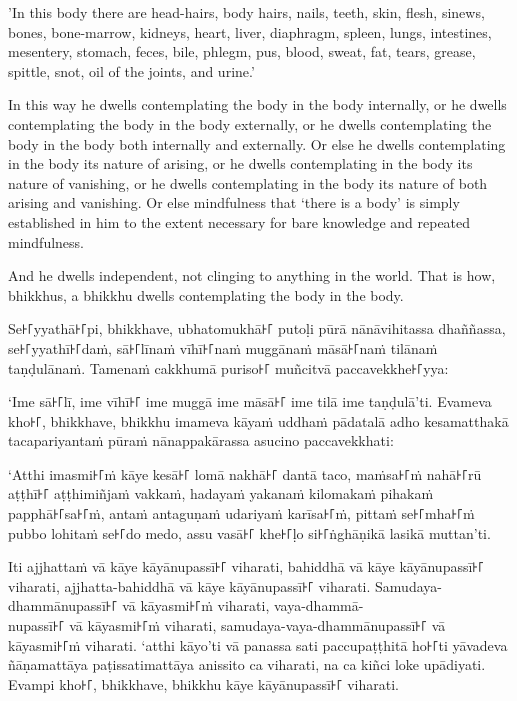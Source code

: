 'In this body there are head-hairs, body hairs, nails, teeth, skin, flesh,
sinews, bones, bone-marrow, kidneys, heart, liver, diaphragm, spleen, lungs,
intestines, mesentery, stomach, feces, bile, phlegm, pus, blood, sweat, fat,
tears, grease, spittle, snot, oil of the joints, and urine.'

In this way he dwells contemplating the body in the body internally, or he
dwells contemplating the body in the body externally, or he dwells contemplating
the body in the body both internally and externally. Or else he dwells
contemplating in the body its nature of arising, or he dwells contemplating in
the body its nature of vanishing, or he dwells contemplating in the body its
nature of both arising and vanishing. Or else mindfulness that ‘there is a body’
is simply established in him to the extent necessary for bare knowledge and
repeated mindfulness.

And he dwells independent, not clinging to anything in the world. That is how,
bhikkhus, a bhikkhu dwells contemplating the body in the body.


\paliPage

Se꜔꜒yyathā꜔꜒pi, bhikkhave, ubhatomukhā꜔꜒ putoḷi pūrā nānāvihitassa dhaññassa,
se꜔꜒yyathī꜔꜒daṁ, sā꜔꜒līnaṁ vīhī꜔꜒naṁ muggānaṁ māsā꜔꜒naṁ tilānaṁ taṇḍulānaṁ. Tamenaṁ
cakkhumā puriso꜔꜒ muñcitvā paccavekkhe꜔꜒yya:

‘Ime sā꜔꜒lī, ime vīhī꜔꜒ ime muggā ime māsā꜔꜒ ime tilā ime taṇḍulā’ti. Evameva kho꜔꜒,
bhikkhave, bhikkhu imameva kāyaṁ uddhaṁ pādatalā adho kesamatthakā
tacapariyantaṁ pūraṁ nānappakārassa asucino paccavekkhati:

‘Atthi imasmi꜔꜒ṁ kāye kesā꜔꜒ lomā nakhā꜔꜒ dantā taco, maṁsa꜔꜒ṁ nahā꜔꜒rū aṭṭhī꜔꜒ aṭṭhimiñjaṁ
vakkaṁ, hadayaṁ yakanaṁ kilomakaṁ pihakaṁ papphā꜔꜒sa꜔꜒ṁ, antaṁ antaguṇaṁ udariyaṁ
karīsa꜔꜒ṁ, pittaṁ se꜔꜒mha꜔꜒ṁ pubbo lohitaṁ se꜔꜒do medo, assu vasā꜔꜒ khe꜔꜒ḷo si꜔꜒ṅghāṇikā
lasikā muttan’ti.

Iti ajjhattaṁ vā kāye kāyānupassī꜔꜒ viharati, bahiddhā vā kāye kāyānupassī꜔꜒
viharati, ajjhatta-bahiddhā vā kāye kāyānupassī꜔꜒ viharati. Samudaya-dhammānupassī꜔꜒
vā kāyasmi꜔꜒ṁ viharati, vaya-dhammā-\\
nupassī꜔꜒ vā kāyasmi꜔꜒ṁ viharati, samudaya-vaya-dhammānupassī꜔꜒ vā kāyasmi꜔꜒ṁ viharati.
‘atthi kāyo’ti vā panassa sati paccupaṭṭhitā ho꜔꜒ti yāvadeva ñāṇamattāya
paṭissatimattāya anissito ca viharati, na ca kiñci loke upādiyati. Evampi kho꜔꜒,
bhikkhave, bhikkhu kāye kāyānupassī꜔꜒ viharati.

